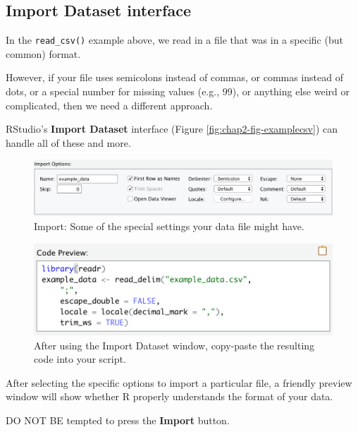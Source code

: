 \documentclass[
  12pt,
  krantz2]{krantz}
\begin{document}
\hypertarget{import-dataset-interface}{%
\subsection{Import Dataset interface}\label{import-dataset-interface}}

In the \texttt{read\_csv()} example above, we read in a file that was in a specific (but common) format.

However, if your file uses semicolons instead of commas, or commas instead of dots, or a special number for missing values (e.g., 99), or anything else weird or complicated, then we need a different approach.

RStudio's \textbf{Import Dataset} interface (Figure \ref{fig:chap2-fig-examplecsv}) can handle all of these and more.

\begin{figure}

{\centering \includegraphics[width=0.7\linewidth]{images/chapter02/import_options} 

}

\caption{Import: Some of the special settings your data file might have.}\label{fig:chap02-fig-import-tool}
\end{figure}

\begin{figure}

{\centering \includegraphics[width=0.5\linewidth]{images/chapter02/code_preview} 

}

\caption{After using the Import Dataset window, copy-paste the resulting code into your script.}\label{fig:chap02-fig-import-code}
\end{figure}

After selecting the specific options to import a particular file, a friendly preview window will show whether R properly understands the format of your data.

DO NOT BE tempted to press the \textbf{Import} button.
\end{document}
